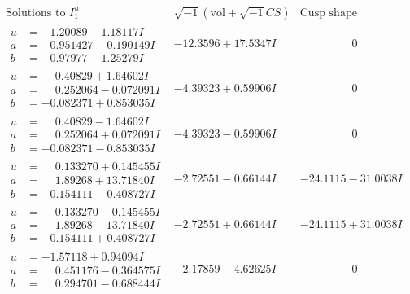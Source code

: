 \documentclass[1p]{elsarticle_modified}
\theoremstyle{definition}
\newcommand{\I}{\sqrt{-1}}
\begin{document}
$$\begin{array}{c|c|c}
 \end{array}$$\newpage$$\begin{array}{c|c|c}  
\text{Solutions to }I^u_{1}& \I (\text{vol} + \sqrt{-1}CS) & \text{Cusp shape}\\
 \hline 
\begin{aligned}
u &= -1.20089 - 1.18117 I \\
a &= -0.951427 - 0.190149 I \\
b &= -0.97977 - 1.25279 I\end{aligned}
 & -12.3596 + 17.5347 I & \phantom{-0.000000 } 0 \\ \hline\begin{aligned}
u &= \phantom{-}0.40829 + 1.64602 I \\
a &= \phantom{-}0.252064 - 0.072091 I \\
b &= -0.082371 + 0.853035 I\end{aligned}
 & -4.39323 + 0.59906 I & \phantom{-0.000000 } 0 \\ \hline\begin{aligned}
u &= \phantom{-}0.40829 - 1.64602 I \\
a &= \phantom{-}0.252064 + 0.072091 I \\
b &= -0.082371 - 0.853035 I\end{aligned}
 & -4.39323 - 0.59906 I & \phantom{-0.000000 } 0 \\ \hline\begin{aligned}
u &= \phantom{-}0.133270 + 0.145455 I \\
a &= \phantom{-}1.89268 + 13.71840 I \\
b &= -0.154111 - 0.408727 I\end{aligned}
 & -2.72551 - 0.66144 I & -24.1115 - 31.0038 I \\ \hline\begin{aligned}
u &= \phantom{-}0.133270 - 0.145455 I \\
a &= \phantom{-}1.89268 - 13.71840 I \\
b &= -0.154111 + 0.408727 I\end{aligned}
 & -2.72551 + 0.66144 I & -24.1115 + 31.0038 I \\ \hline\begin{aligned}
u &= -1.57118 + 0.94094 I \\
a &= \phantom{-}0.451176 - 0.364575 I \\
b &= \phantom{-}0.294701 - 0.688444 I\end{aligned}
 & -2.17859 - 4.62625 I & \phantom{-0.000000 } 0 \\ \hline\begin{aligned}

\end{aligned}
\end{array}$$
\end{document}

